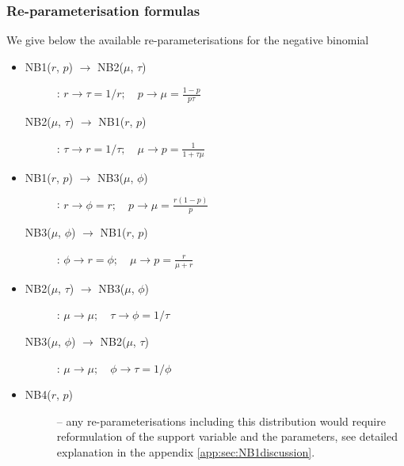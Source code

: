 {\subsubsection{Re-parameterisation formulas}
We give below the available re-parameterisations for the negative binomial
\begin{itemize}
\item 
\begin{description}
\item[NB1($r$, $p$) $\rightarrow$ NB2($\mu$, $\tau$)]:
$r \rightarrow \tau = 1/r; \quad p \rightarrow \mu = \frac{1-p}{p\tau}$

\item[NB2($\mu$, $\tau$) $\rightarrow$ NB1($r$, $p$)]:
$\tau \rightarrow r=1/\tau; \quad \mu \rightarrow p = \frac{1}{1+\tau \mu}$
\end{description}

\item 
\begin{description}
\item[NB1($r$, $p$) $\rightarrow$ NB3($\mu$, $\phi$)]:
$r \rightarrow \phi=r; \quad p \rightarrow \mu=\frac{r (1-p)}{p}$

\item[NB3($\mu$, $\phi$) $\rightarrow$ NB1($r$, $p$)]:
$\phi \rightarrow r=\phi; \quad \mu \rightarrow p=\frac{r}{\mu+r}$
\end{description}

\item 
\begin{description}
\item[NB2($\mu$, $\tau$) $\rightarrow$ NB3($\mu$, $\phi$)]:
$\mu \rightarrow \mu; \quad \tau \rightarrow \phi=1/\tau$

\item[NB3($\mu$, $\phi$) $\rightarrow$ NB2($\mu$, $\tau$)]:
$\mu \rightarrow \mu; \quad \phi \rightarrow \tau=1/\phi$
\end{description}

\item 
\begin{description}
\item[NB4($r$, $p$)] -- any re-parameterisations including this distribution 
would require reformulation of the support variable and the parameters,
see detailed explanation in the appendix \ref{app:sec:NB1discussion}. 
\end{description}

\end{itemize}



}
